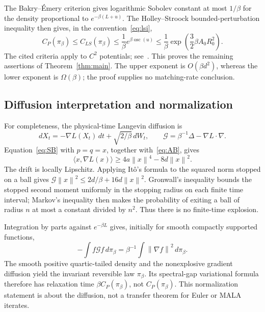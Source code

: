 \documentclass[11pt,letterpaper]{article}
\numberwithin{equation}{section}
\theoremstyle{remark}
\newcommand{\1}{\mathbf 1}
\newcommand{\norm}[1]{\left\lVert#1\right\rVert}
\newcommand{\ip}[2]{\langle#1,#2\rangle}
\begin{document}
The Bakry--\'Emery criterion gives logarithmic Sobolev constant at most $1/\beta$ for the density proportional to $e^{-\beta(L+u)}$. The Holley--Stroock bounded-perturbation inequality then gives, in the convention~\eqref{eq:lsi},
\begin{equation}\label{eq:finiteLSI}
 C_P(\pi_\beta)\le C_{LS}(\pi_\beta)
 \le\frac1\beta e^{\beta\operatorname{osc}(u)}
 \le\frac1\beta\exp\!\left(\frac32\beta A_0R_0^2\right).
\end{equation}
The cited criteria apply to $C^2$ potentials; see~\cite[Theorems 3.1--3.2]{MS}. This proves the remaining assertions of Theorem~\ref{thm:main}. The upper exponent is $O(\beta d^2)$, whereas the lower exponent is $\Omega(\beta)$; the proof supplies no matching-rate conclusion.

\subsection{Diffusion interpretation and normalization}

For completeness, the physical-time Langevin diffusion is
\begin{equation}\label{eq:diffusion}
 dX_t=-\nabla L(X_t)\,dt+\sqrt{2/\beta}\,dW_t,
 \qquad \mathcal G=\beta^{-1}\Delta-\nabla L\cdot\nabla.
\end{equation}
Equation~\eqref{eq:SB} with $p=q=x$, together with~\eqref{eq:AB}, gives
\begin{equation}\label{eq:radialdrift}
 \ip{x}{\nabla L(x)}\ge4a\norm x^4-8d\norm x^2.
\end{equation}
The drift is locally Lipschitz. Applying It\^o's formula to the squared norm stopped on a ball gives
$\mathcal G\norm x^2\le2d/\beta+16d\norm x^2$.
Gronwall's inequality bounds the stopped second moment uniformly in the stopping radius on each finite time interval; Markov's inequality then makes the probability of exiting a ball of radius $n$ at most a constant divided by $n^2$. Thus there is no finite-time explosion.

Integration by parts against $e^{-\beta L}$ gives, initially for smooth compactly supported functions,
\[
 -\int f\mathcal G f\,d\pi_\beta
 =\beta^{-1}\int\norm{\nabla f}^2\,d\pi_\beta.
\]
The smooth positive quartic-tailed density and the nonexplosive gradient diffusion yield the invariant reversible law $\pi_\beta$. Its spectral-gap variational formula therefore has relaxation time $\beta C_P(\pi_\beta)$, not $C_P(\pi_\beta)$. This normalization statement is about the diffusion, not a transfer theorem for Euler or MALA iterates.
\end{document}
